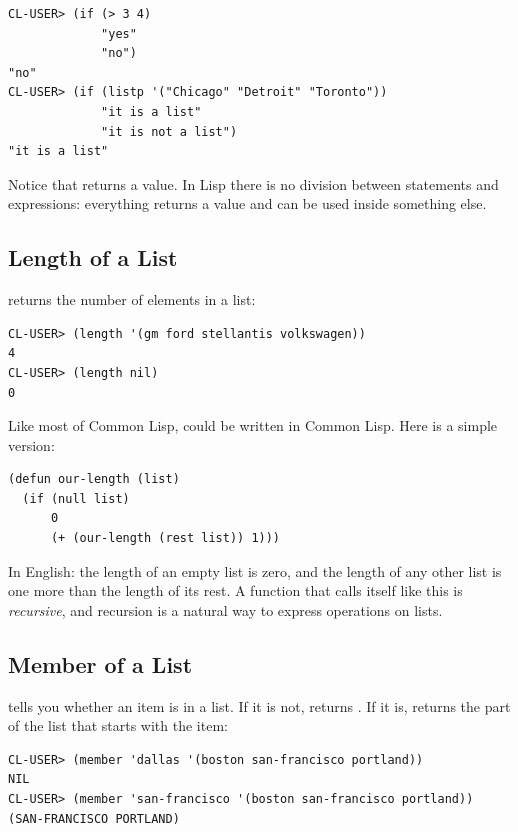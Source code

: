 \begin{verbatim}
CL-USER> (if (> 3 4)
             "yes"
             "no")
"no"
CL-USER> (if (listp '("Chicago" "Detroit" "Toronto"))
             "it is a list"
             "it is not a list")
"it is a list"
\end{verbatim}

Notice that  returns a value. In Lisp there is no division
between statements and expressions: everything returns a value and can
be used inside something else.

\subsection{Length of a List}

 returns the number of elements in a list:

\begin{verbatim}
CL-USER> (length '(gm ford stellantis volkswagen))
4
CL-USER> (length nil)
0
\end{verbatim}

Like most of Common Lisp,  could be written in Common
Lisp. Here is a simple version:

\begin{verbatim}
(defun our-length (list)
  (if (null list)
      0
      (+ (our-length (rest list)) 1)))
\end{verbatim}

In English: the length of an empty list is zero, and the length of any
other list is one more than the length of its rest. A function that
calls itself like this is \emph{recursive}, and recursion is a natural
way to express operations on lists.

\subsection{Member of a List}

 tells you whether an item is in a list. If it is not,
 returns . If it is,  returns the
part of the list that starts with the item:

\begin{verbatim}
CL-USER> (member 'dallas '(boston san-francisco portland))
NIL
CL-USER> (member 'san-francisco '(boston san-francisco portland))
(SAN-FRANCISCO PORTLAND)
\end{verbatim}

